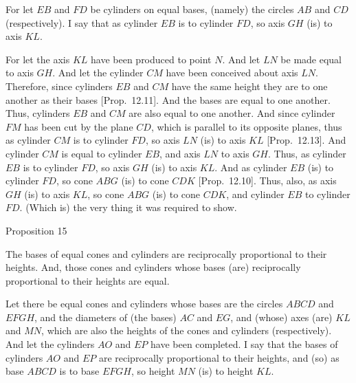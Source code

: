 \epsfysize=1.8in
\centerline{}

For let  $EB$ and $FD$ be cylinders on  equal bases, (namely) the circles $AB$ and $CD$ (respectively). I say that as cylinder $EB$
is to cylinder $FD$, so axis $GH$ (is) to axis $KL$.

For let the axis $KL$ have been produced to point $N$. And let $LN$ be made equal to axis $GH$. 
And let the cylinder $CM$ have been conceived about axis $LN$. Therefore, since cylinders $EB$ and $CM$
have the same height they are to one another as their bases [Prop.~12.11]. And the bases are
equal to one another. Thus, cylinders $EB$ and $CM$ are also equal to one another. And since cylinder $FM$ has been cut
by the plane $CD$, which is parallel to its opposite planes, thus as cylinder $CM$ is to cylinder $FD$, so
axis $LN$ (is) to axis $KL$ [Prop.~12.13]. And cylinder $CM$ is equal to cylinder $EB$, and
axis $LN$ to axis $GH$.  Thus, as cylinder $EB$ is to cylinder $FD$, so axis $GH$ (is) to axis $KL$.  And as
cylinder $EB$ (is) to cylinder $FD$, so cone $ABG$ (is) to cone $CDK$ [Prop.~12.10].
Thus, also, as axis $GH$ (is) to axis $KL$, so cone $ABG$ (is) to cone $CDK$, and cylinder $EB$ to cylinder $FD$.
(Which is) the very thing it was required to show.


\begin{center}
{\large Proposition 15}
\end{center}

The bases of equal cones and cylinders are reciprocally proportional to their heights. And, those
cones and cylinders whose bases (are) reciprocally proportional to their heights are equal.

\epsfysize=1.1in
\centerline{}

Let there be equal cones and cylinders whose bases are the circles $ABCD$ and $EFGH$, and  the diameters of (the bases) $AC$ and $EG$, and
(whose) axes (are) $KL$ and $MN$, which are also the heights of the cones and cylinders (respectively).
And let the cylinders $AO$ and $EP$ have
been completed. I say that the bases of cylinders $AO$  and $EP$ are reciprocally proportional to their heights, and (so) as base
$ABCD$ is to base $EFGH$, so height $MN$ (is) to height $KL$.

